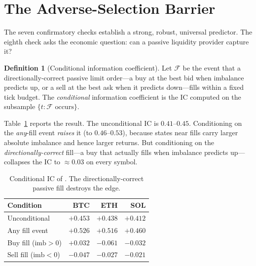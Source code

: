 \documentclass[11pt,a4paper]{article}
\theoremstyle{definition}
\newtheorem{definition}{Definition}[section]
\theoremstyle{plain}
\newcommand{\code}[1]{\texttt{\detokenize{#1}}}
\begin{document}
\section{The Adverse-Selection Barrier}
\label{sec:adverse}

The seven confirmatory checks establish a strong, robust, universal predictor. The eighth check
asks the economic question: can a passive liquidity provider capture it?

\begin{definition}[Conditional information coefficient]
\label{def:cond}
Let $\mathcal{F}$ be the event that a directionally-correct passive limit order---a buy at the best
bid when imbalance predicts up, or a sell at the best ask when it predicts down---fills within a
fixed tick budget. The \emph{conditional} information coefficient is the IC computed on the
subsample $\{t : \mathcal{F} \text{ occurs}\}$.
\end{definition}

Table~\ref{tab:cond} reports the result. The unconditional IC is $0.41$--$0.45$. Conditioning on
the \emph{any}-fill event \emph{raises} it (to $0.46$--$0.53$), because states near fills carry
larger absolute imbalance and hence larger returns. But conditioning on the
\emph{directionally-correct} fill---a buy that actually fills when imbalance predicts up---collapses
the IC to $\approx 0.03$ on every symbol.

\begin{table}[ht]
\begin{center}
\small
\begin{tabular}{lrrr}
\hline
\textbf{Condition} & \textbf{BTC} & \textbf{ETH} & \textbf{SOL} \\
\hline
Unconditional                    & $+0.453$ & $+0.438$ & $+0.412$ \\
Any fill event                   & $+0.526$ & $+0.516$ & $+0.460$ \\
Buy fill ($\text{imb}>0$)        & $+0.032$ & $-0.061$ & $-0.032$ \\
Sell fill ($\text{imb}<0$)       & $-0.047$ & $-0.027$ & $-0.021$ \\
\hline
\end{tabular}
\end{center}
\caption{Conditional IC of \code{imbalance_qty_l1}. The directionally-correct passive fill destroys
the edge.}
\label{tab:cond}
\end{table}
\end{document}
